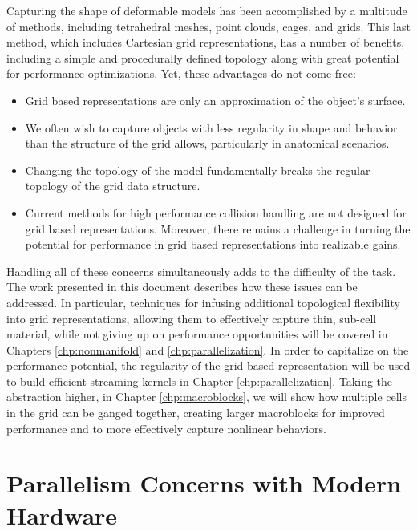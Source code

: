 Capturing the shape of deformable models has been accomplished by a
multitude of methods, including tetrahedral meshes, point clouds,
cages, and grids. This last method, which includes Cartesian grid
representations, has a number of benefits, including a simple and
procedurally defined topology along with great potential for
performance optimizations. Yet, these advantages do not come free:
\begin{itemize}
  \item Grid based representations are only an approximation of the
    object's surface.
  \item We often wish to capture objects with less regularity in shape
    and behavior than the structure of the grid allows, particularly in
    anatomical scenarios.
  \item Changing the topology of the model fundamentally breaks the
    regular topology of the grid data structure.
  \item Current methods for high performance collision handling are
    not designed for grid based representations. Moreover, there
    remains a challenge in turning the potential for performance in
    grid based representations into realizable gains.
  \end{itemize}
  Handling all of these concerns simultaneously adds to the difficulty
  of the task. The work presented in this document describes how these
  issues can be addressed. In particular, techniques for infusing
  additional topological flexibility into grid representations,
  allowing them to effectively capture thin, sub-cell material, while
  not giving up on performance opportunities will be covered in
  Chapters \ref{chp:nonmanifold} and \ref{chp:parallelization}. In
  order to capitalize on the performance potential, the regularity of
  the grid based representation will be used to build efficient
  streaming kernels in Chapter \ref{chp:parallelization}. Taking the
  abstraction higher, in Chapter \ref{chp:macroblocks}, we will show
  how multiple cells in the grid can be ganged together, creating
  larger macroblocks for improved performance and to more
  effectively capture nonlinear behaviors.

\section{Parallelism Concerns with Modern Hardware}

